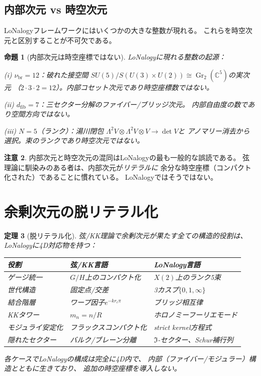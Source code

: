 \documentclass[12pt]{article}
\theoremstyle{plain}
\newtheorem{theorem}{定理}[section]
\newtheorem{proposition}[theorem]{命題}
\theoremstyle{definition}
\newtheorem{remark}[theorem]{注意}
\numberwithin{equation}{section}
\newcommand{\C}{\mathbb{C}}
\newcommand{\br}{\mathrm{br}}
\newcommand{\fI}{\mathfrak{I}}
\DeclareMathOperator{\Gr}{Gr}
\begin{document}
\subsection{内部次元 vs 時空次元}

LoNalogyフレームワークにはいくつかの大きな整数が現れる。
これらを時空次元と区別することが不可欠である。

\begin{proposition}[内部次元は時空座標ではない]\label{prop:internal}
LoNalogyに現れる整数の起源：

(i) $\nu_{\br}=12$：破れた接空間
$SU(5)/S(U(3)\times U(2))\cong\Gr_2(\C^5)$の実次元
（$2\cdot 3\cdot 2=12$）。内部コセット次元であり時空座標数ではない。

(ii) $d_{\mathrm{fib}}=7$：三セクター分解のファイバー/ブリッジ次元。
内部自由度の数であり空間方向ではない。

(iii) $N=5$（ランク）：湯川閉包
$\Lambda^2 V\otimes\Lambda^2 V\otimes V\to\det V$と
アノマリー消去から選択。束のランクであり時空次元ではない。
\end{proposition}

\begin{remark}
内部次元と時空次元の混同はLoNalogyの最も一般的な誤読である。
弦理論に馴染みのある者は、内部次元が\emph{リテラルに}
余分な時空座標（コンパクト化された）であることに慣れている。
LoNalogyではそうではない。
\end{remark}


\section{余剰次元の脱リテラル化}\label{sec:delit}

\begin{theorem}[脱リテラル化]\label{thm:delit}
弦/KK理論で余剰次元が果たす全ての構造的役割は、
LoNalogyに4D対応物を持つ：

\begin{center}
\begin{tabular}{lll}
\toprule
役割 & 弦/KK言語 & LoNalogy言語\\
\midrule
ゲージ統一 & $G/H$上のコンパクト化 & $X(2)$上のランク5束\\
世代構造 & 固定点/交差 & 3カスプ$\{0,1,\infty\}$\\
結合階層 & ワープ因子$e^{-kr_c\pi}$ & ブリッジ相互律\\
KKタワー & $m_n = n/R$ & ホロノミーフーリエモード\\
モジュライ安定化 & フラックスコンパクト化 & strict kernel方程式\\
隠れたセクター & バルク/ブレーン分離 & $\fI$-セクター、Schur補行列\\
\bottomrule
\end{tabular}
\end{center}

各ケースでLoNalogyの構成は完全に4D内で、
内部（ファイバー/モジュラー）構造とともに生きており、
追加の時空座標を導入しない。
\end{theorem}
\end{document}
